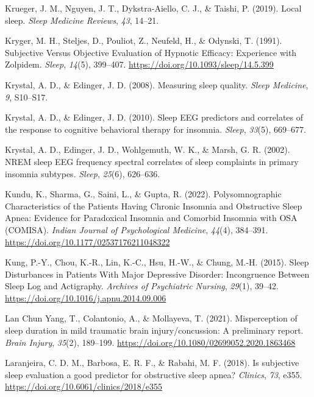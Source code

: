 \documentclass[
]{article}
\newlength{\cslhangindent}
\newenvironment{CSLReferences}[2] %
 {\begin{list}{}{%
  \setlength{\itemindent}{0pt}
  \setlength{\leftmargin}{0pt}
  \setlength{\parsep}{0pt}
  \ifodd #1
   \setlength{\leftmargin}{\cslhangindent}
   \setlength{\itemindent}{-1\cslhangindent}
  \fi
  \setlength{\itemsep}{#2\baselineskip}}}
 {\end{list}}
\begin{document}
\begin{CSLReferences}{1}{0}
Krueger, J. M., Nguyen, J. T., Dykstra-Aiello, C. J., \& Taishi, P. (2019). Local sleep. \emph{Sleep Medicine Reviews}, \emph{43}, 14--21.

Kryger, M. H., Steljes, D., Pouliot, Z., Neufeld, H., \& Odynski, T. (1991). Subjective {Versus} {Objective} {Evaluation} of {Hypnotic} {Efficacy}: {Experience} with {Zolpidem}. \emph{Sleep}, \emph{14}(5), 399--407. \url{https://doi.org/10.1093/sleep/14.5.399}

Krystal, A. D., \& Edinger, J. D. (2008). Measuring sleep quality. \emph{Sleep Medicine}, \emph{9}, S10--S17.

Krystal, A. D., \& Edinger, J. D. (2010). Sleep EEG predictors and correlates of the response to cognitive behavioral therapy for insomnia. \emph{Sleep}, \emph{33}(5), 669--677.

Krystal, A. D., Edinger, J. D., Wohlgemuth, W. K., \& Marsh, G. R. (2002). NREM sleep EEG frequency spectral correlates of sleep complaints in primary insomnia subtypes. \emph{Sleep}, \emph{25}(6), 626--636.

Kundu, K., Sharma, G., Saini, L., \& Gupta, R. (2022). Polysomnographic {Characteristics} of the {Patients} {Having} {Chronic} {Insomnia} and {Obstructive} {Sleep} {Apnea}: {Evidence} for {Paradoxical} {Insomnia} and {Comorbid} {Insomnia} with {OSA} ({COMISA}). \emph{Indian Journal of Psychological Medicine}, \emph{44}(4), 384--391. \url{https://doi.org/10.1177/02537176211048322}

Kung, P.-Y., Chou, K.-R., Lin, K.-C., Hsu, H.-W., \& Chung, M.-H. (2015). Sleep {Disturbances} in {Patients} {With} {Major} {Depressive} {Disorder}: {Incongruence} {Between} {Sleep} {Log} and {Actigraphy}. \emph{Archives of Psychiatric Nursing}, \emph{29}(1), 39--42. \url{https://doi.org/10.1016/j.apnu.2014.09.006}

Lan Chun Yang, T., Colantonio, A., \& Mollayeva, T. (2021). Misperception of sleep duration in mild traumatic brain injury/concussion: A preliminary report. \emph{Brain Injury}, \emph{35}(2), 189--199. \url{https://doi.org/10.1080/02699052.2020.1863468}

Laranjeira, C. D. M., Barbosa, E. R. F., \& Rabahi, M. F. (2018). Is subjective sleep evaluation a good predictor for obstructive sleep apnea? \emph{Clinics}, \emph{73}, e355. \url{https://doi.org/10.6061/clinics/2018/e355}


\end{CSLReferences}
\end{document}
